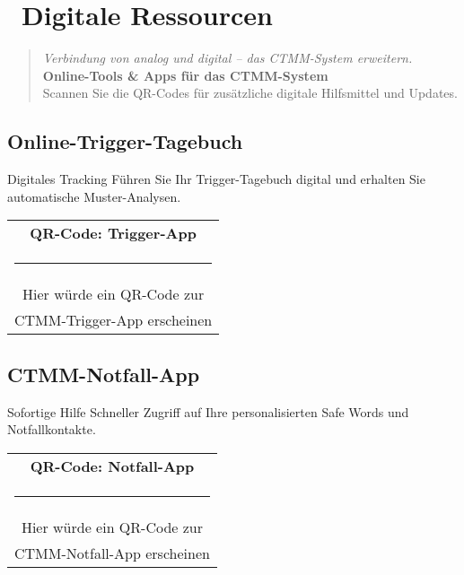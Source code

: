 
\newpage
\section*{\textcolor{ctmmPurple}{\faQrcode~Digitale Ressourcen}}

\begin{quote}
\textit{\textcolor{ctmmOrange}{Verbindung von analog und digital -- das CTMM-System erweitern.}}\\
\textbf{\textcolor{ctmmPurple}{Online-Tools \& Apps für das CTMM-System}}\\
Scannen Sie die QR-Codes für zusätzliche digitale Hilfsmittel und Updates.
\end{quote}

\subsection*{\textcolor{ctmmPurple}{Online-Trigger-Tagebuch}}

\begin{ctmmBlueBox}{Digitales Tracking}
Führen Sie Ihr Trigger-Tagebuch digital und erhalten Sie automatische Muster-Analysen.

\begin{center}
\begin{tabular}{c}
\textbf{QR-Code: Trigger-App}\\
\rule{3cm}{3cm}\\
\small{Hier würde ein QR-Code zur}\\
\small{CTMM-Trigger-App erscheinen}
\end{tabular}
\end{center}
\end{ctmmBlueBox}

\subsection*{\textcolor{ctmmPurple}{CTMM-Notfall-App}}

\begin{ctmmRedBox}{Sofortige Hilfe}
Schneller Zugriff auf Ihre personalisierten Safe Words und Notfallkontakte.

\begin{center}
\begin{tabular}{c}
\textbf{QR-Code: Notfall-App}\\
\rule{3cm}{3cm}\\
\small{Hier würde ein QR-Code zur}\\
\small{CTMM-Notfall-App erscheinen}
\end{tabular}
\end{center}
\end{ctmmRedBox}

